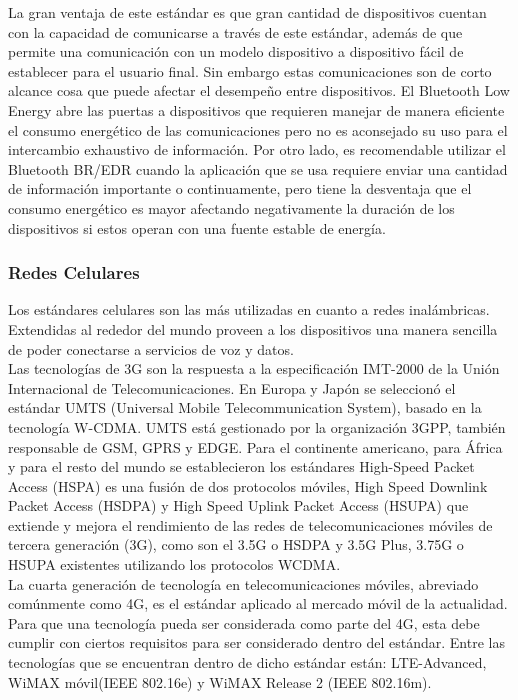 La gran ventaja de este estándar es que gran cantidad de dispositivos cuentan con la capacidad de comunicarse a través de este estándar, además de que permite una comunicación con un modelo dispositivo a dispositivo fácil de establecer para el usuario final. Sin embargo estas comunicaciones son de corto alcance cosa que puede afectar el desempeño entre dispositivos. El Bluetooth Low Energy abre las puertas a dispositivos que requieren manejar de manera eficiente el consumo energético de las comunicaciones pero no es aconsejado su uso para el intercambio exhaustivo de información. Por otro lado, es recomendable utilizar el Bluetooth BR/EDR cuando la aplicación que se usa requiere enviar una cantidad de información importante o continuamente, pero tiene la desventaja que el consumo energético es mayor afectando negativamente la duración de los dispositivos si estos operan con una fuente estable de energía.

\subsubsection{Redes Celulares}
Los estándares celulares son las más utilizadas en cuanto a redes inalámbricas. Extendidas al rededor del mundo proveen a los dispositivos una manera sencilla de poder conectarse a servicios de voz y datos. \\

Las tecnologías de 3G son la respuesta a la especificación IMT-2000 de la Unión Internacional de Telecomunicaciones\cite{itu2000}. En Europa y Japón se seleccionó el estándar UMTS (Universal Mobile Telecommunication System)\cite{umts}, basado en la tecnología W-CDMA\cite{wcdma}. UMTS está gestionado por la organización 3GPP, también responsable de GSM, GPRS y EDGE. Para el continente americano, para África y para el resto del mundo se establecieron los estándares High-Speed Packet Access (HSPA)\cite{hspa} es una fusión de dos protocolos móviles, High Speed Downlink Packet Access (HSDPA)\cite{hspa} y High Speed Uplink Packet Access (HSUPA)\cite{hspa} que extiende y mejora el rendimiento de las redes de telecomunicaciones móviles de tercera generación (3G), como son el 3.5G o HSDPA y 3.5G Plus, 3.75G o HSUPA existentes utilizando los protocolos WCDMA.\\

La cuarta generación de tecnología en telecomunicaciones móviles, abreviado comúnmente como 4G, es el estándar aplicado al mercado móvil de la actualidad. Para que una tecnología pueda ser considerada como parte del 4G, esta debe cumplir con ciertos requisitos para ser considerado dentro del estándar. Entre las tecnologías que se encuentran dentro de dicho estándar están: LTE-Advanced\cite{LTE-advanced}, WiMAX móvil(IEEE 802.16e)\cite{ieee80216} y WiMAX Release 2 (IEEE 802.16m).\cite{ieee80216}\\


